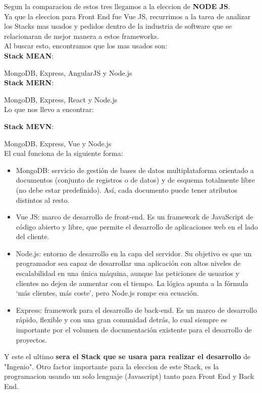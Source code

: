 \documentclass[a4paper,12 pt]{article}
\begin{document}
Segun la comparacion de estos tres llegamos a la eleccion de \textbf{NODE JS}.\\

Ya que la eleccion para Front End fue  Vue JS, recurrimos a la tarea de analizar los Stacks mas usados y pedidos dentro de la industria de software que se relacionaran de mejor manera a estos frameworks.\\

Al buscar esto, encontramos que los mas usados son:\\ 

\textbf{Stack MEAN}:

MongoDB, Express, AngularJS y Node.js\\

\textbf{Stack MERN}:

MongoDB, Express, React y Node.js\\

Lo que nos llevo a encontrar:

\textbf{Stack MEVN}:

MongoDB, Express, Vue y Node.js\\


El cual funciona de la siguiente forma:
\begin{itemize}
\item MongoDB: servicio de gestión de bases de datos multiplataforma orientado a documentos (conjunto de registros o de datos) y de esquema totalmente libre (no debe estar predefinido). Así, cada documento puede tener atributos distintos al resto.
\item Vue JS: marco de desarrollo de front-end. Es un framework de JavaScript de código abierto y libre, que permite el desarrollo de aplicaciones web en el lado del cliente.
\item Node.js: entorno de desarrollo en la capa del servidor. Su objetivo es que un programador sea capaz de desarrollar una aplicación con altos niveles de escalabilidad en una única máquina, aunque las peticiones de usuarios y clientes no dejen de aumentar con el tiempo.  La lógica apunta a la fórmula ‘más clientes, más coste’, pero Node.js rompe esa ecuación.
\item Express: framework para el desarrollo de back-end. Es un marco de desarrollo rápido, flexible y con una gran comunidad detrás, lo cual siempre es importante por el volumen de documentación existente para el desarrollo de proyectos.
\end{itemize}

Y este el ultimo \textbf{sera el Stack que se usara para realizar el desarrollo} de "Ingenio". Otro factor importante para la eleccion de este Stack, es la programacion usando un solo lenguaje (Javascript) tanto para Front End y Back End.
\end{document}
